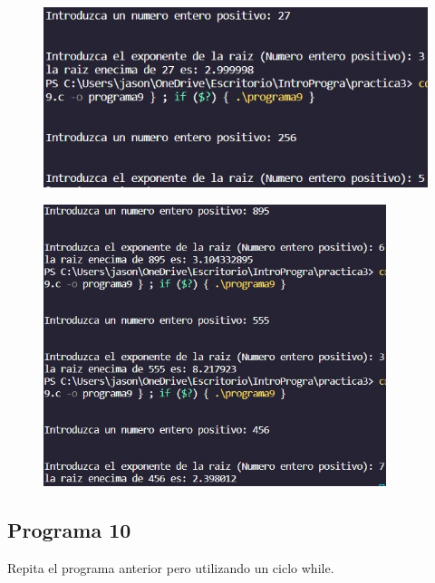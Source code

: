 \documentclass{article}
\begin{document}
\begin{figure}[H]
    \centering
    \includegraphics[width = 15cm]{img9a.jpg}
\end{figure}
\begin{figure}[H]
    \centering
    \includegraphics[width = 10cm]{img9b.jpg}
\end{figure}
\newpage
\subsection{Programa 10}

Repita el programa anterior pero utilizando un ciclo while.
\end{document}
